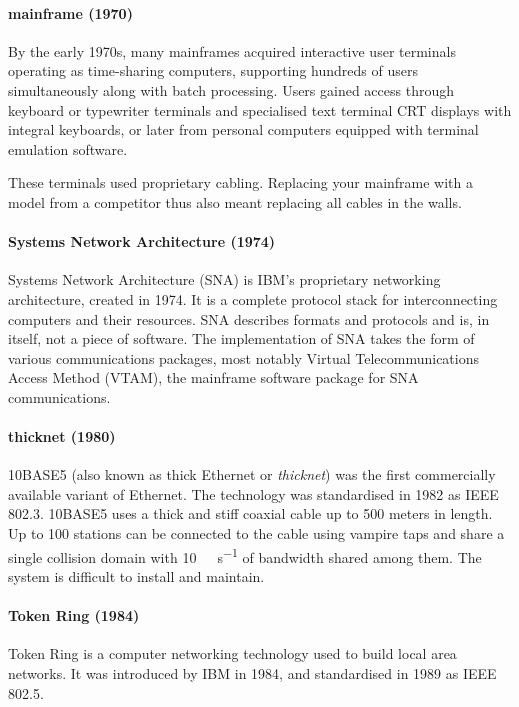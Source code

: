 {\paragraph{mainframe (1970)}
By the early 1970s, many mainframes acquired interactive user terminals operating as time-sharing computers, supporting hundreds of users simultaneously along with batch processing.
Users gained access through keyboard or typewriter terminals and specialised text terminal CRT displays with integral keyboards, or later from personal computers equipped with terminal emulation software.

These terminals used proprietary cabling.
Replacing your mainframe with a model from a competitor thus also meant replacing all cables in the walls.
    
\paragraph{Systems Network Architecture (1974)}
Systems Network Architecture (SNA) is IBM's proprietary networking architecture, created in 1974.
It is a complete protocol stack for interconnecting computers and their resources.
SNA describes formats and protocols and is, in itself, not a piece of software.
The implementation of SNA takes the form of various communications packages, most notably Virtual Telecommunications Access Method (VTAM), the mainframe software package for SNA communications.
    
\paragraph{thicknet (1980)}
10BASE5 (also known as thick Ethernet or \emph{thicknet}) was the first commercially available variant of Ethernet.
The technology was standardised in 1982 as IEEE 802.3.
10BASE5 uses a thick and stiff coaxial cable up to 500 meters in length.
Up to 100 stations can be connected to the cable using vampire taps and share a single collision domain with \SI{10}{\mega\bit\per\second} of bandwidth shared among them.
The system is difficult to install and maintain.

\paragraph{Token Ring (1984)}
Token Ring is a computer networking technology used to build local area networks.
It was introduced by IBM in 1984, and standardised in 1989 as IEEE 802.5.

}
